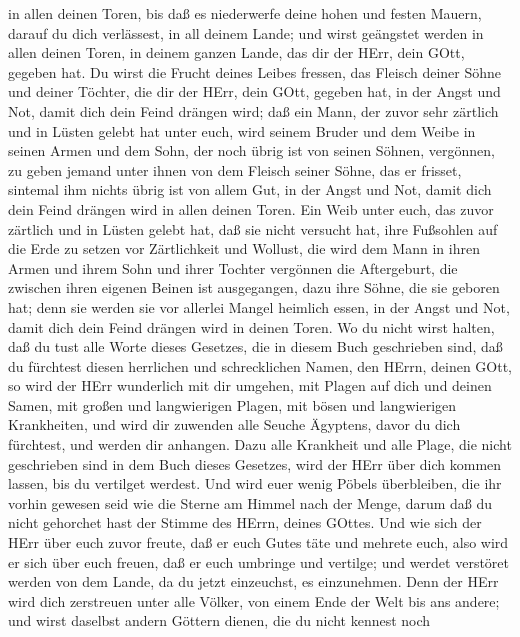 in allen deinen Toren, bis daß es niederwerfe deine hohen und festen
Mauern, darauf du dich verlässest, in all deinem Lande; und wirst
geängstet werden in allen deinen Toren, in deinem ganzen Lande, das dir
der HErr, dein GOtt, gegeben hat.  Du wirst die Frucht
deines Leibes fressen, das Fleisch deiner Söhne und deiner Töchter, die
dir der HErr, dein GOtt, gegeben hat, in der Angst und Not, damit dich
dein Feind drängen wird;  daß ein Mann, der zuvor sehr
zärtlich und in Lüsten gelebt hat unter euch, wird seinem Bruder und dem
Weibe in seinen Armen und dem Sohn, der noch übrig ist von seinen
Söhnen, vergönnen,  zu geben jemand unter ihnen von dem
Fleisch seiner Söhne, das er frisset, sintemal ihm nichts übrig ist von
allem Gut, in der Angst und Not, damit dich dein Feind drängen wird in
allen deinen Toren.  Ein Weib unter euch, das zuvor
zärtlich und in Lüsten gelebt hat, daß sie nicht versucht hat, ihre
Fußsohlen auf die Erde zu setzen vor Zärtlichkeit und Wollust, die wird
dem Mann in ihren Armen und ihrem Sohn und ihrer Tochter vergönnen
 die Aftergeburt, die zwischen ihren eigenen Beinen ist
ausgegangen, dazu ihre Söhne, die sie geboren hat; denn sie werden sie
vor allerlei Mangel heimlich essen, in der Angst und Not, damit dich
dein Feind drängen wird in deinen Toren.  Wo du nicht wirst
halten, daß du tust alle Worte dieses Gesetzes, die in diesem Buch
geschrieben sind, daß du fürchtest diesen herrlichen und schrecklichen
Namen, den HErrn, deinen GOtt,  so wird der HErr wunderlich
mit dir umgehen, mit Plagen auf dich und deinen Samen, mit großen und
langwierigen Plagen, mit bösen und langwierigen Krankheiten,
 und wird dir zuwenden alle Seuche Ägyptens, davor du dich
fürchtest, und werden dir anhangen.  Dazu alle Krankheit
und alle Plage, die nicht geschrieben sind in dem Buch dieses Gesetzes,
wird der HErr über dich kommen lassen, bis du vertilget werdest.
 Und wird euer wenig Pöbels überbleiben, die ihr vorhin
gewesen seid wie die Sterne am Himmel nach der Menge, darum daß du nicht
gehorchet hast der Stimme des HErrn, deines GOttes.  Und
wie sich der HErr über euch zuvor freute, daß er euch Gutes täte und
mehrete euch, also wird er sich über euch freuen, daß er euch umbringe
und vertilge; und werdet verstöret werden von dem Lande, da du jetzt
einzeuchst, es einzunehmen.  Denn der HErr wird dich
zerstreuen unter alle Völker, von einem Ende der Welt bis ans andere;
und wirst daselbst andern Göttern dienen, die du nicht kennest noch
